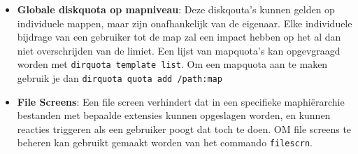 \documentclass{report}
\begin{document}
\begin{enumerate}
{\begin{itemize}
\begin{itemize}
						\item \textbf{Globale diskquota op mapniveau}: Deze diskqouta's kunnen gelden op individuele mappen, maar zijn onafhankelijk van de eigenaar. Elke individuele bijdrage van een gebruiker tot de map zal een impact hebben op het al dan niet overschrijden van de limiet. Een lijst van mapquota's kan opgevgraagd worden met \texttt{dirquota template list}. Om een mapquota aan te maken gebruik je dan \texttt{dirquota quota add /path:map}
						\item \textbf{File Screens}: Een file screen verhindert dat in een specifieke maphiërarchie bestanden met bepaalde extensies kunnen opgeslagen worden, en kunnen reacties triggeren als een gebruiker poogt dat toch te doen. OM file screens te beheren kan gebruikt gemaakt worden van het commando \texttt{filescrn}. 
					\end{itemize}
				
				
			\end{itemize}
		}
	\end{enumerate}
	
\end{document}
